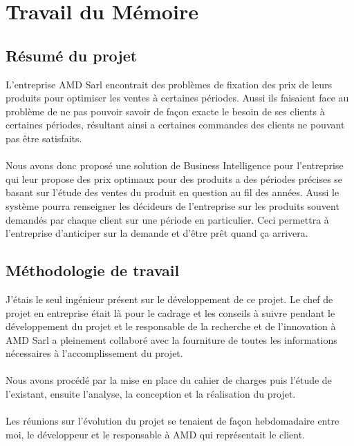 \section{Travail du Mémoire}

\subsection{Résumé du projet}
L'entreprise AMD Sarl encontrait des problèmes de fixation des prix de leurs produits pour optimiser les ventes à certaines périodes. Aussi ils faisaient face au problème de ne pas pouvoir savoir de façon exacte le besoin de ses clients à certaines périodes, résultant ainsi a certaines commandes des clients ne pouvant pas être satisfaits. 
\paragraph{}
Nous avons donc proposé une solution de Business Intelligence pour l’entreprise qui leur propose des prix optimaux pour des produits a des périodes précises se basant sur l’étude des ventes du produit en question au fil des années. Aussi le système pourra renseigner les décideurs de l’entreprise sur les produits souvent demandés par chaque client sur une période en particulier. Ceci permettra à l’entreprise d’anticiper sur la demande et d’être prêt quand ça arrivera.

\subsection{Méthodologie de travail}
J’étais le seul ingénieur présent sur le développement de ce projet. Le chef de projet en entreprise était là pour le cadrage et les conseils à suivre pendant le développement du projet et le responsable de la recherche et de l’innovation à AMD Sarl a pleinement collaboré avec la fourniture de toutes les informations nécessaires à l’accomplissement du projet.
\paragraph{}
Nous avons procédé par la mise en place du cahier de charges puis l’étude de l’existant, ensuite l’analyse, la conception et la réalisation du projet. 
\paragraph{}
Les réunions sur l’évolution du projet se tenaient de façon hebdomadaire entre moi, le développeur et le responsable à AMD qui représentait le client. 

